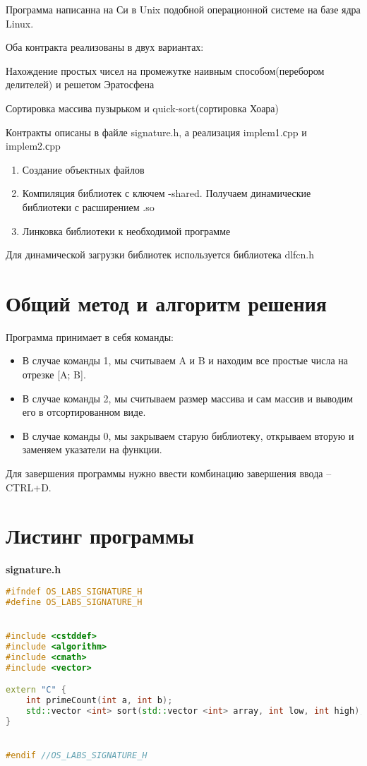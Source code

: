 \documentclass[pdf, unicode, 12pt, a4paper,oneside,fleqn]{article}
\begin{document}
Программа написанна на Си в Unix подобной операционной системе на базе ядра Linux.

Оба контракта реализованы в двух вариантах:

Нахождение простых чисел на промежутке наивным способом(перебором делителей) и решетом Эратосфена

Сортировка массива пузырьком и quick-sort(сортировка Хоара)

Контракты описаны в файле signature.h, а реализация implem1.сpp и implem2.сpp

\begin{enumerate}
    \item Создание объектных файлов
    \item Компиляция библиотек с ключем -shared. Получаем динамические библиотеки с расширением .so 
    \item Линковка библиотеки к необходимой программе
\end{enumerate}

Для динамической загрузки библиотек используется библиотека dlfcn.h

\section{Общий метод и алгоритм решения}

Программа принимает в себя команды: 
\begin{itemize}
    \item В случае команды 1, мы считываем A и B и находим все простые числа на отрезке [A; B].
    \item В случае команды 2, мы считываем размер массива и сам массив и выводим его в отсортированном виде.
    \item В случае команды 0, мы закрываем старую библиотеку, открываем вторую и заменяем указатели на функции.
\end{itemize}

Для завершения программы нужно ввести комбинацию завершения ввода \--- CTRL+D.

\section{Листинг программы}

{\large\textbf{signature.h}}

\begin{lstlisting}[language=C++]
#ifndef OS_LABS_SIGNATURE_H
#define OS_LABS_SIGNATURE_H


#include <cstddef>
#include <algorithm>
#include <cmath>
#include <vector>

extern "C" {
    int primeCount(int a, int b);
    std::vector <int> sort(std::vector <int> array, int low, int high);
}


#endif //OS_LABS_SIGNATURE_H

\end{lstlisting}
\end{document}
